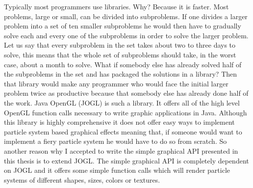 Typically most programmers use libraries. Why? Because it is faster. Most problems, large or small, can be divided into subproblems. If one divides a larger problem into a set of ten smaller subproblems he would then have to gradually solve each and every one of the subproblems in order to solve the larger problem. Let us say that every subproblem in the set takes about two to three days to solve, this means that the whole set of subproblems should take, in the worst case, about a month to solve. What if somebody else has already solved half of the subproblems in the set and has packaged the solutions in a library? Then that library would make any programmer who would face the initial larger problem twice as productive because that somebody else has already done half of the work. Java OpenGL (JOGL) is such a library. It offers all of the high level OpenGL function calls necessary to write graphic applications in Java. Although this library is highly comprehensive it does not offer easy ways to implement particle system based graphical effects meaning that, if someone would want to implement a fiery particle system he would have to do so from scratch. So another reason why I accepted to write the simple graphical API presented in this thesis is to extend JOGL. The simple graphical API is completely dependent on JOGL and it offers some simple function calls which will render particle systems of different shapes, sizes, colors or textures.\\